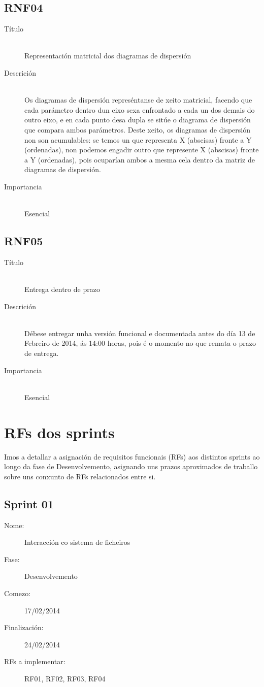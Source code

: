 \subsection*{RNF04}
\begin{description}
\item[Título] \hfill \\
Representación matricial dos diagramas de dispersión
\item[Descrición] \hfill \\
Os diagramas de dispersión represéntanse de xeito matricial, facendo que cada parámetro dentro dun eixo sexa enfrontado a cada un dos demais do outro eixo, e en cada punto desa dupla se sitúe o diagrama de dispersión que compara ambos parámetros. Deste xeito, os diagramas de dispersión non son acumulables: se temos un que representa X (abscisas) fronte a Y (ordenadas), non podemos engadir outro que represente X (abscisas) fronte a Y (ordenadas), pois ocuparían ambos a mesma cela dentro da matriz de diagramas de dispersión.
\item[Importancia] \hfill \\
Esencial
\end{description}

\subsection*{RNF05}
\begin{description}
\item[Título] \hfill \\
Entrega dentro de prazo
\item[Descrición] \hfill \\
Débese entregar unha versión funcional e documentada antes do día 13 de Febreiro de 2014, ás 14:00 horas, pois é o momento no que remata o prazo de entrega.
\item[Importancia] \hfill \\
Esencial
\end{description}

\section{RFs dos sprints}

Imos a detallar a asignación de requisitos funcionais (RFs) aos distintos sprints ao longo da fase de Desenvolvemento, asignando uns prazos aproximados de traballo sobre uns conxunto de RFs relacionados entre si.

\subsection*{Sprint 01}
\begin{description}
\item[Nome:] Interacción co sistema de ficheiros
\item[Fase:] Desenvolvemento
\item[Comezo:] 17/02/2014
\item[Finalización:] 24/02/2014
\item[RFs a implementar:] RF01, RF02, RF03, RF04
\end{description}

